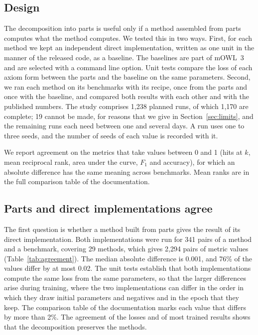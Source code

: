 \documentclass[runningheads]{llncs}
\begin{document}
\subsection{Design}

The decomposition into parts is useful only if a method assembled from parts computes
what the method computes. We tested this in two ways. First, for each method we kept an
independent direct implementation, written as one unit in the manner of the released
code, as a baseline. The baselines are part of mOWL~3 and are selected with a command
line option. Unit tests compare the loss of each axiom form between the parts and the
baseline on the same parameters. Second, we ran each method on its benchmarks with its
recipe, once from the parts and once with the baseline, and compared both results with
each other and with the published numbers. The study comprises 1,238 planned runs, of
which 1,170 are complete; 19 cannot be made, for reasons that we give in
Section~\ref{sec:limits}, and the remaining runs each need between one and several days.
A run uses one to three seeds, and the number of seeds of each value is recorded with it.

We report agreement on the metrics that take values between 0 and 1 (hits at $k$, mean
reciprocal rank, area under the curve, $F_1$ and accuracy), for which an absolute
difference has the same meaning across benchmarks. Mean ranks are in the full comparison
table of the documentation.

\subsection{Parts and direct implementations agree}

The first question is whether a method built from parts gives the result of its direct
implementation. Both implementations were run for 341 pairs of a method and a benchmark,
covering 29 methods, which gives 2,294 pairs of metric values
(Table~\ref{tab:agreement}). The median absolute difference is 0.001, and 76\% of the
values differ by at most 0.02. The unit tests establish that both implementations compute
the same loss from the same parameters, so that the larger differences arise during
training, where the two implementations can differ in the order in which they draw
initial parameters and negatives and in the epoch that they keep. The comparison table
of the documentation marks each value that differs by more than 2\%. The agreement of
the losses and of most trained results shows that the decomposition preserves the
methods.
\end{document}
